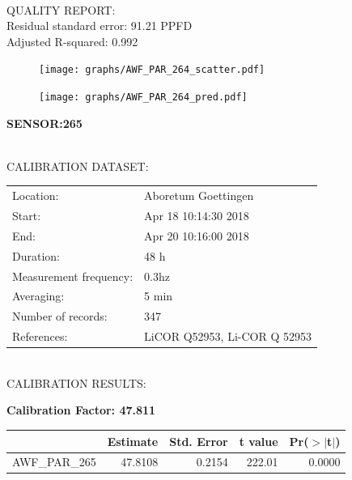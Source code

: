 \documentclass[oneside]{report}
\begin{document}
\hrulefill\\
QUALITY REPORT:\\
Residual standard error: 91.21 PPFD\\
Adjusted R-squared: 0.992



\begin{figure}[H]
  \centering
  \texttt{[image: graphs/AWF\_PAR\_264\_scatter.pdf]}
\end{figure}




\begin{figure}[H]
  \centering
  \texttt{[image: graphs/AWF\_PAR\_264\_pred.pdf]}
\end{figure}

\pagebreak


\begin{center}
\large{\textbf{SENSOR:265}}\\
\end{center}

\hrulefill\\
CALIBRATION DATASET:\\
\begin{table}[h!]
  \centering
  \label{tab:table1}
  \begin{tabular}{ll}
    Location: & Aboretum Goettingen\\ 
    
    
    Start:  & Apr 18 10:14:30 2018 \\
    End:   & Apr 20 10:16:00 2018\\ 
    Duration: & 48 h\\
    Measurement frequency: & 0.3hz\\
    Averaging:  &5 min\\
    Number of records: & 347 \\
    References: & LiCOR Q52953, Li-COR Q 52953 \\
  \end{tabular}
\end{table}

\hrulefill\\
CALIBRATION RESULTS:\\


\begin{center}
\textbf{\large{Calibration Factor: 47.811}}\\
\end{center}
\begin{table}[ht]
\centering
\begin{tabular}{rrrrr}
  \hline
 & Estimate & Std. Error & t value & Pr($>$$|$t$|$) \\ 
  \hline
AWF\_PAR\_265 & 47.8108 & 0.2154 & 222.01 & 0.0000 \\ 
   \hline
\end{tabular}
\end{table}
\end{document}
